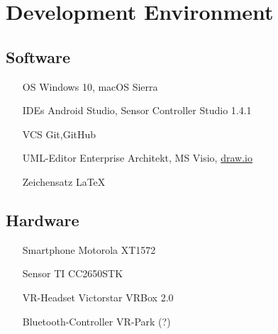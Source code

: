 \section{Development Environment}

\subsection{Software}

\begin{itemize}
  \item[OS] Windows 10, macOS Sierra
  \item[IDEs]  Android Studio, Sensor Controller Studio 1.4.1
  \item[VCS] Git,GitHub
  \item[UML-Editor] Enterprise Architekt, MS Visio, \href{draw.io}{draw.io}
  \item[Zeichensatz] \LaTeX

\end{itemize}

\subsection{Hardware}

\begin{itemize}
  \item[Smartphone] Motorola XT1572
  \item[Sensor] TI CC2650STK
  \item[VR-Headset] Victorstar VRBox 2.0
  \item[Bluetooth-Controller] VR-Park (?)
\end{itemize}
